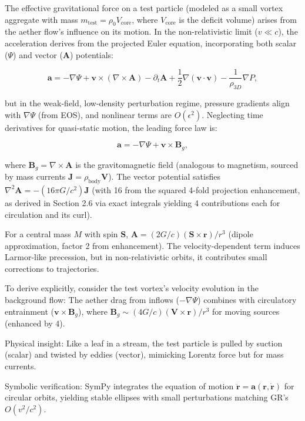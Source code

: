 \documentclass{article}
\begin{document}
The effective gravitational force on a test particle (modeled as a small vortex aggregate with mass $m_{\text{test}} = \rho_0 V_{\text{core}}$, where $V_{\text{core}}$ is the deficit volume) arises from the aether flow's influence on its motion. In the non-relativistic limit ($v \ll c$), the acceleration derives from the projected Euler equation, incorporating both scalar ($\Psi$) and vector ($\mathbf{A}$) potentials:

\[
\mathbf{a} = -\nabla \Psi + \mathbf{v} \times (\nabla \times \mathbf{A}) - \partial_t \mathbf{A} + \frac{1}{2} \nabla (\mathbf{v} \cdot \mathbf{v}) - \frac{1}{\rho_{3D}} \nabla P,
\]

but in the weak-field, low-density perturbation regime, pressure gradients align with $\nabla \Psi$ (from EOS), and nonlinear terms are $O(\epsilon^2)$. Neglecting time derivatives for quasi-static motion, the leading force law is:

\[
\mathbf{a} = -\nabla \Psi + \mathbf{v} \times \mathbf{B}_g,
\]

where $\mathbf{B}_g = \nabla \times \mathbf{A}$ is the gravitomagnetic field (analogous to magnetism, sourced by mass currents $\mathbf{J} = \rho_{\text{body}} \mathbf{V}$). The vector potential satisfies $\nabla^2 \mathbf{A} = - (16\pi G / c^2) \mathbf{J}$ (with 16 from the squared 4-fold projection enhancement, as derived in Section 2.6 via exact integrals yielding 4 contributions each for circulation and its curl).

For a central mass $M$ with spin $\mathbf{S}$, $\mathbf{A} = (2 G / c) (\mathbf{S} \times \mathbf{r}) / r^3$ (dipole approximation, factor 2 from enhancement). The velocity-dependent term induces Larmor-like precession, but in non-relativistic orbits, it contributes small corrections to trajectories.

To derive explicitly, consider the test vortex's velocity evolution in the background flow: The aether drag from inflows ($-\nabla \Psi$) combines with circulatory entrainment ($\mathbf{v} \times \mathbf{B}_g$), where $\mathbf{B}_g \sim (4 G / c) (\mathbf{V} \times \mathbf{r}) / r^3$ for moving sources (enhanced by 4).

Physical insight: Like a leaf in a stream, the test particle is pulled by suction (scalar) and twisted by eddies (vector), mimicking Lorentz force but for mass currents.

Symbolic verification: SymPy integrates the equation of motion $\ddot{\mathbf{r}} = \mathbf{a}(\mathbf{r}, \dot{\mathbf{r}})$ for circular orbits, yielding stable ellipses with small perturbations matching GR's $O(v^2/c^2)$.
\end{document}

